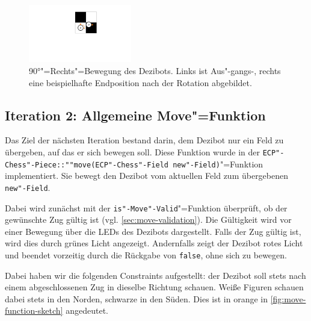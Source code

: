 \begin{figure}[h]
    \centering
    \includegraphics[width=0.4\textwidth]{../assets/dezibot_rotation_position_offset.pdf}
    \caption{90°"=Rechts"=Bewegung des Dezibots. Links ist Aus"-gangs-, rechts eine beispielhafte Endposition nach der Rotation abgebildet.}
    \label{fig:dezibot-rotation-position-offset}
\end{figure}


\subsection{Iteration 2: Allgemeine Move"=Funktion}
\label{sec:general-move-function}

Das Ziel der nächsten Iteration bestand darin, dem Dezibot nur ein Feld zu übergeben, auf das er sich bewegen soll. Diese Funktion wurde in der \texttt{ECP"-Chess"-Piece::""move(ECP"-Chess"-Field new"-Field)}"=Funktion implementiert. Sie bewegt den Dezibot vom aktuellen Feld zum übergebenen \texttt{new"-Field}.

Dabei wird zunächst mit der \texttt{is"-Move"-Valid}"=Funktion überprüft, ob der gewünschte Zug gültig ist (vgl. \autoref{sec:move-validation}). Die Gültigkeit wird vor einer Bewegung über die LEDs des Dezibots dargestellt. Falls der Zug gültig ist, wird dies durch grünes Licht angezeigt. Andernfalls zeigt der Dezibot rotes Licht und beendet vorzeitig durch die Rückgabe von \texttt{false}, ohne sich zu bewegen.


Dabei haben wir die folgenden Constraints aufgestellt: der Dezibot soll stets nach einem abgeschlossenen Zug in dieselbe Richtung schauen. Weiße Figuren schauen dabei stets in den Norden, schwarze in den Süden. Dies ist in orange in \autoref{fig:move-function-sketch} angedeutet.


